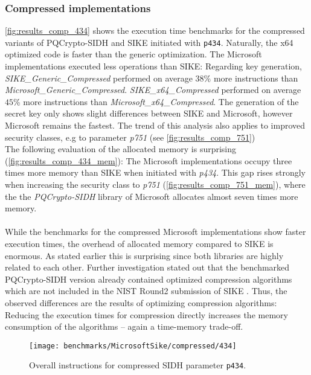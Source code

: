 \subsubsection{Compressed implementations}
\autoref{fig:results_comp_434} shows the execution time benchmarks for the compressed variants of \gls{PQCrypto-SIDH} and \gls{SIKE} initiated with \texttt{p434}. Naturally, the x64 optimized code is faster than the generic optimization. The Microsoft implementations executed less operations than \gls{SIKE}: Regarding key generation, \textit{SIKE\_Generic\_Compressed} performed on average $38$\% more instructions than \textit{Microsoft\_Generic\_Compressed}. \textit{SIKE\_x64\_Compressed} performed on average $45$\% more instructions than \textit{Microsoft\_x64\_Compressed}. The generation of the secret key only shows slight differences between \gls{SIKE} and Microsoft, however Microsoft remains the fastest. The trend of this analysis also applies to improved security classes, e.g to parameter \textit{p751} (see \autoref{fig:results_comp_751})
\\
The following evaluation of the allocated memory is surprising (\autoref{fig:results_comp_434_mem}): The Microsoft implementations occupy three times more memory than \gls{SIKE} when initiated with \textit{p434}. This gap rises strongly when increasing the security class to \textit{p751} (\autoref{fig:results_comp_751_mem}), where the the \textit{ \gls{PQCrypto-SIDH}} library of Microsoft allocates almost seven times more memory.
\\\\
While the benchmarks for the compressed Microsoft implementations show faster execution times, the overhead of allocated memory compared to \gls{SIKE} is enormous. As stated earlier this is surprising since both libraries are highly related to each other. Further investigation stated out that the benchmarked \gls{PQCrypto-SIDH} version already contained optimized compression algorithms \parencite{cryptoeprint:2020:431} which are not included in the NIST Round2 submission of \gls{SIKE} \parencite{sike2020spec}. Thus, the observed differences are the results of optimizing compression algorithms: Reducing the execution times for compression directly increases the memory consumption of the algorithms -- again a time-memory trade-off.

\begin{figure}[H]
  \centering
  \texttt{[image: benchmarks/MicrosoftSike/compressed/434]}
  \caption[Overall instructions compressed p434]
  {Overall instructions for compressed \gls{SIDH} parameter \texttt{p434}.}
  \label{fig:results_comp_434}
\end{figure}

